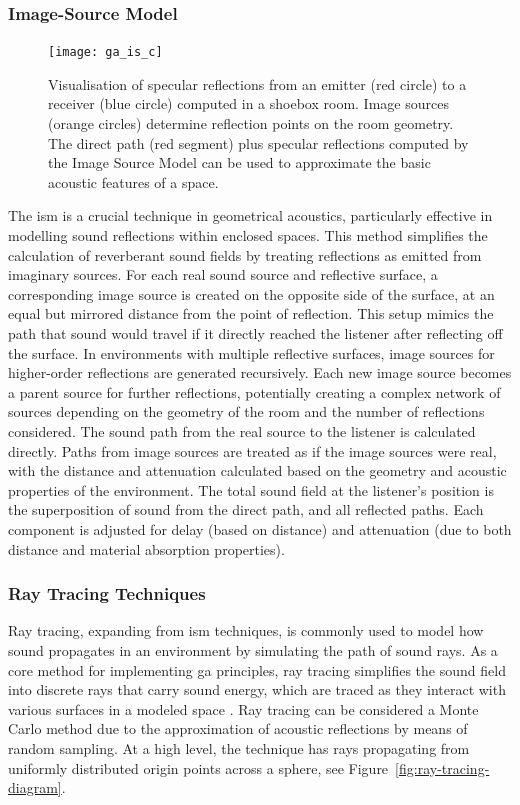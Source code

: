 \subsubsection{Image-Source Model}
\begin{figure}
    \centering
    \texttt{[image: ga\_is\_c]}
    \caption[Image Source Model demonstration]{Visualisation of specular reflections from an emitter (red circle) to a receiver (blue circle) computed in a shoebox room. Image sources (orange circles) determine reflection points on the room geometry. The direct path (red segment) plus specular reflections computed by the Image Source Model can be used to approximate the basic acoustic features of a space.}
    \label{fig:ga_shoebox}
\end{figure}
The \acrfull{ism} is a crucial technique in geometrical acoustics, particularly effective in modelling sound reflections within enclosed spaces. This method simplifies the calculation of reverberant sound fields by treating reflections as emitted from imaginary sources.
For each real sound source and reflective surface, a corresponding image source is created on the opposite side of the surface, at an equal but mirrored distance from the point of reflection. This setup mimics the path that sound would travel if it directly reached the listener after reflecting off the surface. In environments with multiple reflective surfaces, image sources for higher-order reflections are generated recursively. Each new image source becomes a parent source for further reflections, potentially creating a complex network of sources depending on the geometry of the room and the number of reflections considered. The sound path from the real source to the listener is calculated directly. Paths from image sources are treated as if the image sources were real, with the distance and attenuation calculated based on the geometry and acoustic properties of the environment. The total sound field at the listener's position is the superposition of sound from the direct path, and all reflected paths. Each component is adjusted for delay (based on distance) and attenuation (due to both distance and material absorption properties).

\subsubsection{Ray Tracing Techniques}
Ray tracing, expanding from \acrshort{ism} techniques, is commonly used to model how sound propagates in an environment by simulating the path of sound rays. As a core method for implementing \acrshort{ga} principles, ray tracing simplifies the sound field into discrete rays that carry sound energy, which are traced as they interact with various surfaces in a modeled space \citep{savioja2015overview}. Ray tracing can be considered a Monte Carlo method due to the approximation of acoustic reflections by means of random sampling. At a high level, the technique has rays propagating from uniformly distributed origin points across a sphere, see Figure~\ref{fig:ray-tracing-diagram}.

